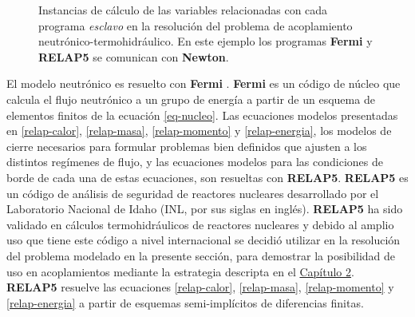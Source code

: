 \begin{figure}[h]
\caption[Instancias de cálculo de las variables relacionadas con cada programa \textit{esclavo}]
{Instancias de cálculo de las variables relacionadas con cada programa \textit{esclavo} en la resolución del problema de acoplamiento neutrónico-termohidráulico.
En este ejemplo los programas \textbf{Fermi} y \textbf{RELAP5} se comunican con \textbf{Newton}.}
\label{esquema-fermi-relap}
\end{figure}

El modelo neutrónico es resuelto con \textbf{Fermi} \cite{fermi}.
\textbf{Fermi} es un código de núcleo que calcula el flujo neutrónico a un grupo de energía a partir de un esquema de elementos finitos de la ecuación \ref{eq-nucleo}.
Las ecuaciones modelos presentadas en \ref{relap-calor}, \ref{relap-masa}, \ref{relap-momento} y \ref{relap-energia},
los modelos de cierre necesarios para formular problemas bien definidos que ajusten a los distintos regímenes de flujo,
y las ecuaciones modelos para las condiciones de borde de cada una de estas ecuaciones,
son resueltas con \textbf{RELAP5}.
\textbf{RELAP5} es un código de análisis de seguridad de reactores nucleares desarrollado por el Laboratorio Nacional de Idaho (INL, por sus siglas en inglés).
\textbf{RELAP5} ha sido validado en cálculos termohidráulicos de reactores nucleares y debido al amplio uso que tiene este código a nivel internacional
se decidió utilizar en la resolución del problema modelado en la presente sección,
para demostrar la posibilidad de uso en acoplamientos mediante la estrategia descripta en el \hyperlink{chapter.2}{Capítulo 2}.
\textbf{RELAP5} resuelve las ecuaciones \ref{relap-calor}, \ref{relap-masa}, \ref{relap-momento} y \ref{relap-energia} a partir de esquemas semi-implícitos de diferencias finitas.


